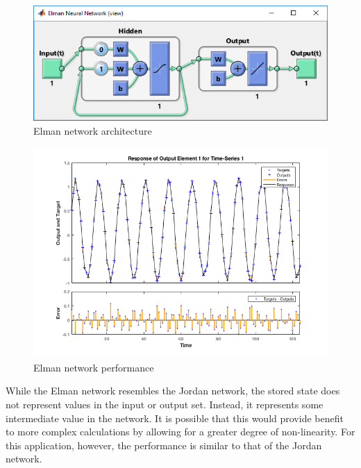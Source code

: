 \documentclass{IEEEtran}
\begin{document}
\begin{figure}[ht]
    \centering
    \includegraphics[width=\linewidth]{elman/net}
    \caption{Elman network architecture \label{fig:elman}}
\end{figure}

\begin{figure}[ht]
    \centering
    \includegraphics[width=\linewidth]{elman/full_data_perf}
    \caption{Elman network performance \label{fig:elmanperf}}
\end{figure}

While the Elman network resembles the Jordan network, the stored state does not represent values in the input or output set. Instead, it represents some intermediate value in the network. It is possible that this would provide benefit to more complex calculations by allowing for a greater degree of non-linearity. For this application, however, the performance is similar to that of the Jordan network.
\end{document}
